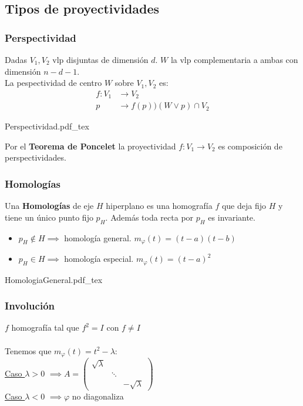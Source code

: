 \documentclass[leqno]{article}
\newcommand{\incfig}[1]{%
  \def\svgwidth{0.9\columnwidth}
  {#1.pdf_tex}
}
\begin{document}
\subsection{Tipos de proyectividades}
\subsubsection{Perspectividad}
\begin{minipage}{0.7\textwidth}
Dadas  $V_1, V_2$ vlp disjuntas de dimensión $d$.  $W$ la vlp complementaria a ambas con dimensión  $n-d-1$.\\
La pespectividad de centro $W$ sobre  $V_1, V_2$ es:
\begin{align*}
  f: V_1 & \to V_2  \\
  p & \to f(p))(W\lor p)\cap V_2
\end{align*}
\end{minipage}  
\begin{minipage}{0.3\textwidth}
  \incfig{Perspectividad}
\end{minipage}
Por el \textbf{Teorema de Poncelet} la proyectividad $f: V_1\to V_2$ es composición de perspectividades.

\subsubsection{Homologías}
\begin{minipage}{0.7\textwidth}
Una \textbf{Homologías} de eje $H$ hiperplano es una homografía  $f$ que deja fijo  $H$ y tiene un único punto fijo $p_H$. Además toda recta por $p_H$ es invariante.
	 \begin{itemize}
	  \item $p_H\notin H \implies$ homología general. $m_\varphi(t) = (t-a)(t-b)$
	  \item $p_H\in H \implies$ homología especial. $m_\varphi (t) = (t-a)^2$
	\end{itemize}
\end{minipage}
\begin{minipage}{0.3\textwidth}
  \incfig{HomologiaGeneral} 
\end{minipage}

\subsubsection{Involución}
$f$ homografía tal que  $f^2 = I$ con  $f\neq  I$\\
\\
Tenemos que $m_\varphi(t) = t^2-\lambda$: \\
\underline{Caso $\lambda>0$} $\implies A = \begin{pmatrix} \sqrt{\lambda} & & \\ &  \ddots & \\ & & -\sqrt{\lambda}  \end{pmatrix} $  \\
\underline{Caso $\lambda<0$} $\implies \varphi $ no diagonaliza  
\end{document}
